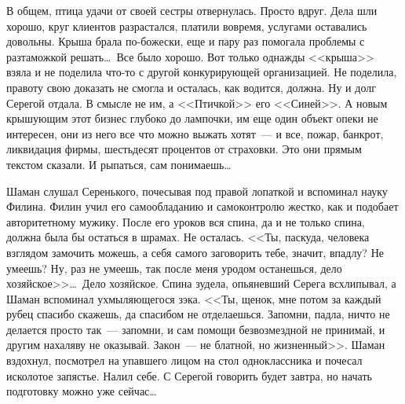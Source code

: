 В общем, птица удачи от своей сестры отвернулась. Просто вдруг. Дела шли 
хорошо, круг клиентов разрастался, платили вовремя, услугами оставались довольны. Крыша 
брала по-божески, еще и пару раз помогала проблемы с разтаможкой решать\ldots\ 
Все было хорошо. Вот только однажды <<крыша>> взяла и не поделила что-то с другой 
конкурирующей организацией. Не поделила, правоту свою доказать не смогла и 
осталась, как водится, должна. Ну и долг Серегой отдала. В смысле не им, а 
<<Птичкой>> его <<Синей>>. А новым крышующим этот бизнес глубоко до лампочки, 
им еще 
один объект опеки не интересен, они из него все что можно выжать хотят~--- и 
все, 
пожар, банкрот, ликвидация фирмы, шестьдесят процентов от страховки. Это они 
прямым текстом сказали. И рыпаться, сам понимаешь\ldots

Шаман слушал Серенького, почесывая под правой лопаткой и вспоминал науку 
Филина. 
Филин учил его самообладанию и самоконтролю жестко, как и подобает 
авторитетному 
мужику. После его уроков вся спина, да и не только спина, должна была бы 
остаться в шрамах. Не осталась. <<Ты, паскуда, человека взглядом замочить 
можешь, 
а себя самого заговорить тебе, значит, впадлу? Не умеешь? Ну, раз не умеешь, 
так 
после меня уродом останешься, дело хозяйское>>\ldots\ Дело хозяйское. Спина 
зудела, 
опьяневший Серега всхлипывал, а Шаман вспоминал ухмыляющегося зэка. <<Ты, 
щенок, 
мне потом за каждый рубец спасибо скажешь, да спасибом не отделаешься. Запомни, 
падла, ничто не делается просто так~--- запомни, и сам помощи безвозмездной не 
принимай, и другим нахаляву не оказывай. Закон~--- не блатной, но жизненный>>. 
Шаман вздохнул, посмотрел на упавшего лицом на стол одноклассника и почесал 
исколотое запястье. Налил себе. С Серегой говорить будет завтра, но начать 
подготовку можно уже сейчас\ldots

